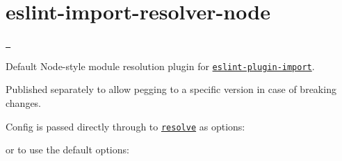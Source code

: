 \chapter{eslint-\/import-\/resolver-\/node}
\hypertarget{md_pkiclassroomrescheduler_2src_2main_2frontend_2node__modules_2eslint-import-resolver-node_2_r_e_a_d_m_e}{}\label{md_pkiclassroomrescheduler_2src_2main_2frontend_2node__modules_2eslint-import-resolver-node_2_r_e_a_d_m_e}
\label{md_pkiclassroomrescheduler_2src_2main_2frontend_2node__modules_2eslint-import-resolver-node_2_r_e_a_d_m_e_autotoc_md9360}%
%
 \href{https://www.npmjs.com/package/eslint-import-resolver-node}{\texttt{ }}

Default Node-\/style module resolution plugin for \href{https://www.npmjs.com/package/eslint-plugin-import}{\texttt{ {\ttfamily eslint-\/plugin-\/import}}}.

Published separately to allow pegging to a specific version in case of breaking changes.

Config is passed directly through to \href{https://www.npmjs.com/package/resolve\#resolve-sync-id-opts}{\texttt{ {\ttfamily resolve}}} as options\+:


\begin{DoxyCode}{0}
\DoxyCodeLine{}
\DoxyCodeLine{}
\DoxyCodeLine{}
\DoxyCodeLine{}

\end{DoxyCode}


or to use the default options\+:


\begin{DoxyCode}{0}

\end{DoxyCode}
 